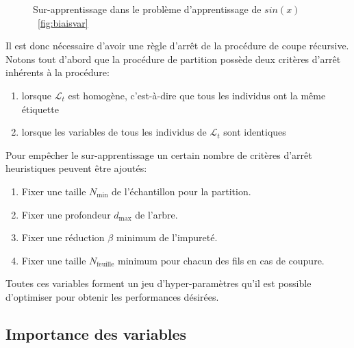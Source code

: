 
\begin{figure}[htbp]
    \caption{Sur-apprentissage dans le problème d'apprentissage de $sin(x)$~\ref{fig:biaisvar}}
\end{figure}

Il est donc nécessaire d'avoir une règle d'arrêt de la procédure de coupe récursive. Notons tout d'abord que la procédure de partition possède deux critères d'arrêt inhérents à la procédure:
\begin{enumerate}
    \item lorsque $\mathcal{L}_t$ est homogène, c'est-à-dire que tous les individus ont la même étiquette
    \item lorsque les variables de tous les individus de $\mathcal{L}_t$ sont identiques
\end{enumerate}
Pour empêcher le sur-apprentissage un certain nombre de critères d'arrêt heuristiques peuvent être ajoutés:
\begin{enumerate}
    \item Fixer une taille $N_{\text{min}}$ de l'échantillon pour la partition.
    \item Fixer une profondeur $d_{\text{max}}$ de l'arbre.
    \item Fixer une réduction $\beta$ minimum de l'impureté.
    \item Fixer une taille $N_{\text{feuille}}$ minimum pour chacun des fils en cas de coupure.
\end{enumerate}

Toutes ces variables forment un jeu d'hyper-paramètres qu'il est possible d'optimiser pour obtenir les performances désirées.

\subsection{Importance des variables}

